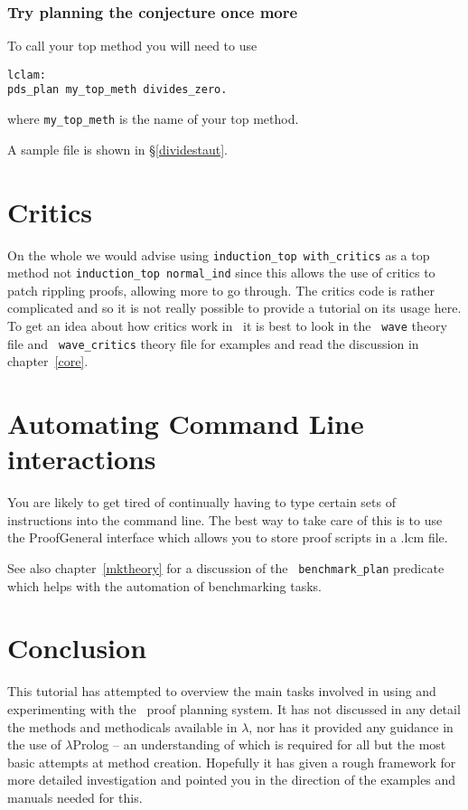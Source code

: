 \subsubsection*{Try planning the conjecture once more}

To call your top method you will need to use

\begin{verbatim}
lclam:
pds_plan my_top_meth divides_zero.
\end{verbatim}
where {\tt my\_top\_meth} is the name of your top method.

A sample file is shown in \S\ref{dividestaut}.

\section{Critics}
\label{sec:tut:critics}
On the whole we would advise using {\tt induction\_top
  with\_critics} as a top
method not {\tt induction\_top
  normal\_ind} since this
allows the use of critics to patch rippling proofs, allowing more to
go through.  The critics code is rather complicated and so it is not
really possible to provide a tutorial on its usage here.  To get an
idea about how critics work in \lclam\ it is best to look in the {\tt
  wave} theory file and {\tt
  wave\_critics} theory file for examples and
read the discussion in chapter~\ref{core}.

\section{Automating Command Line interactions}
You are likely to get tired of continually having to type certain sets
of instructions into the command line.  The best way to take care of
this is to use the ProofGeneral interface which allows you to store
proof scripts in a .lcm file.

See also chapter~\ref{mktheory} for a discussion of the {\tt
  benchmark\_plan} predicate which helps with
the automation of benchmarking tasks.

\section{Conclusion}
This tutorial has attempted to overview the main tasks involved in
using and experimenting with the \lclam\ proof
planning system.  It has not discussed in any detail the methods and
methodicals available in $\lambda${\clam}, nor has it provided any
guidance in the use of $\lambda$Prolog -- an understanding of which is
required for all but the most basic attempts at method creation.
Hopefully it has given a rough framework for more detailed
investigation and pointed you in the direction of the examples and
manuals needed for this.

